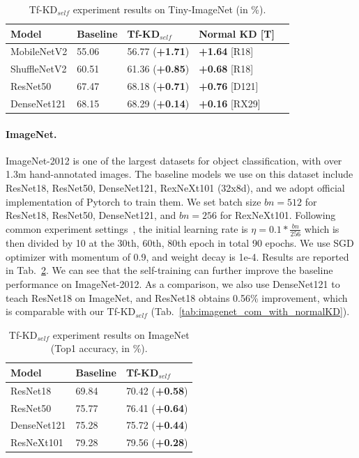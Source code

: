 \documentclass[10pt,twocolumn,letterpaper]{article}
\begin{document}
\begin{table}[!h]
\renewcommand\arraystretch{1.1}
\centering
\caption{Tf-KD$_{self}$ experiment results on Tiny-ImageNet (in \%).}
\small
\label{tab:self_t_imagenet}
\begin{tabular}{lllll}
\hline
Model  & Baseline  & Tf-KD$_{self}$ & Normal KD [T] \\ \hline
MobileNetV2  &55.06 &56.77 (\textbf{+1.71}) &\textbf{+1.64} [R18]\\ 
ShuffleNetV2 &60.51 &61.36 (\textbf{+0.85}) &\textbf{+0.68} [R18]\\ 
ResNet50   &67.47 & 68.18 (\textbf{+0.71}) & \textbf{+0.76} [D121] \\
DenseNet121 &68.15 &68.29 (\textbf{+0.14}) &\textbf{+0.16} [RX29]\\ \hline
\end{tabular}
\vspace{-10pt}
\end{table}


\paragraph{ImageNet.} ImageNet-2012 is one of the largest datasets for object classification, with over 1.3m hand-annotated images. The baseline models we use on this dataset include ResNet18, ResNet50, DenseNet121, RexNeXt101 (32x8d), and we adopt official implementation of Pytorch to train them. We set batch size $bn=512$ for ResNet18, ResNet50, DenseNet121, and $bn=256$ for RexNeXt101. Following common experiment settings~\cite{goyal2017accurate}, the initial learning rate is $\eta =0.1*\frac{bn}{256}$ which is then divided by 10 at the 30th, 60th, 80th epoch in  total 90 epochs. We use SGD optimizer with momentum of 0.9, and weight decay is 1e-4. 
Results are reported in Tab.~\ref{tab:self_imagenet}. We can see that the self-training can further improve the baseline performance on ImageNet-2012. As a comparison, we also use DenseNet121 to teach ResNet18 on ImageNet, and ResNet18 obtains 0.56\% improvement, which is comparable with our Tf-KD$_{self}$ (Tab.~\ref{tab:imagenet_com_with_normalKD}). 
\vspace{-7pt}


\begin{table}[!h]
\renewcommand\arraystretch{1.1}
\centering
\caption{Tf-KD$_{self}$ experiment results on ImageNet (Top1 accuracy, in \%).}
\small
\begin{tabular}{lll}
\hline
Model  & Baseline & Tf-KD$_{self}$  \\ \hline
ResNet18   &69.84 &70.42 (\textbf{+0.58}) \\
ResNet50   &75.77 &76.41 (\textbf{+0.64}) \\
DenseNet121 &75.28 &75.72 (\textbf{+0.44}) \\ 
ResNeXt101 &79.28 &79.56 (\textbf{+0.28}) \\\hline
\end{tabular}
\label{tab:self_imagenet}
\vspace{-15pt}
\end{table}
\end{document}
